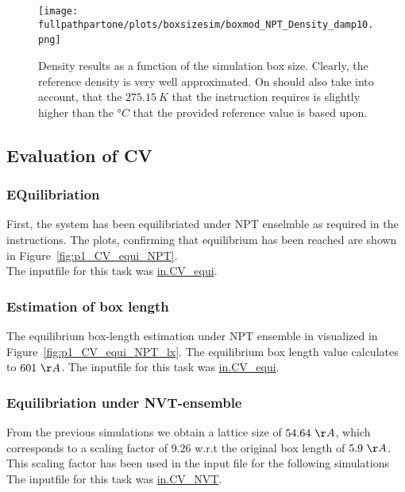 \documentclass[10pt,a4paper]{report}
\def \pathpartone {../../1_three-dimensional_atomic_system}
\def \fullpathpartone {/home/lukas/Desktop/project/independence/atomistic_modeling/exam/1_three-dimensional_atomic_system}
\begin{document}
\begin{center}
\begin{figure}[h]
\texttt{[image: \\fullpathpartone/plots/boxsizesim/boxmod\_NPT\_Density\_damp10.png]}~
\caption[aaa]{Density results as a function of the simulation box size. Clearly, the reference density is very well approximated. On should also take into account, that the $275.15~K$ that the instruction requires is slightly higher than the $°C$ that the provided reference value is based upon.}
\label{fig:pressure_over_atomnum}
\end{figure}
\end{center}







\subsection{Evaluation of CV}

\subsubsection{EQuilibriation}
First, the system has been equilibriated under NPT enselmble as required in the instructions. The plots, confirming that equilibrium has been reached are shown in Figure~\ref{fig:p1_CV_equi_NPT}.\\
The inputfile for this task was \href{\pathpartone/in.CV_equi}{in.CV\_equi}.


\subsubsection{Estimation of box length}
The equilibrium box-length estimation under NPT ensemble in visualized in Figure~\ref{fig:p1_CV_equi_NPT_lx}. The equilibrium box length value calculates to $601~\AA$.
The inputfile for this task was \href{\pathpartone/in.CV_equi}{in.CV\_equi}.

\subsubsection{Equilibriation under NVT-ensemble}
From the previous simulations we obtain a lattice size of $54.64~\AA$, which corresponds to a scaling factor of $9.26$ w.r.t the original box length of $5.9~\AA$.\\
This scaling factor has been used in the input file for the following simulations The inputfile for this task was \href{\pathpartone/in.CV_NVT}{in.CV\_NVT}.
\end{document}
